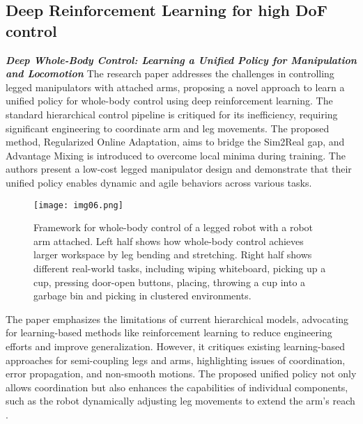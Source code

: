 \subsection{Deep Reinforcement Learning for high DoF control}

\textbf{\textit{Deep Whole-Body Control: Learning a Unified Policy
for Manipulation and Locomotion}} \quad
The research paper \cite{fu2022deeplegged} addresses the challenges in controlling legged
manipulators with attached arms, proposing a novel approach to learn a unified policy for
whole-body control using deep reinforcement learning. The standard hierarchical control pipeline
is critiqued for its inefficiency, requiring significant engineering to coordinate
arm and leg movements. The proposed method, Regularized Online Adaptation, aims to bridge the Sim2Real gap,
and Advantage Mixing is introduced to overcome local minima during training.
The authors present a low-cost legged manipulator design and demonstrate that their
unified policy enables dynamic and agile behaviors across various tasks.

\begin{figure}[H]
	\centering
	\texttt{[image: img06.png]}
	\captionsetup{width=1\linewidth}
	\caption{Framework for whole-body control of a legged robot with a robot arm attached.
		Left half shows how whole-body control achieves larger workspace by leg bending and stretching.
		Right half shows different real-world tasks, including wiping whiteboard, picking up a cup,
		pressing door-open buttons, placing, throwing a cup into a garbage bin and picking
		in clustered environments. \cite{fu2022deeplegged}}
	\label{fig:img06}
\end{figure}

The paper emphasizes the limitations of current hierarchical models, advocating for learning-based
methods like reinforcement learning to reduce engineering efforts and improve generalization.
However, it critiques existing learning-based approaches for semi-coupling legs and arms,
highlighting issues of coordination, error propagation, and non-smooth motions.
The proposed unified policy not only allows coordination but also enhances the capabilities
of individual components, such as the robot dynamically adjusting leg movements to extend
the arm's reach \cite{fu2022deeplegged}.


